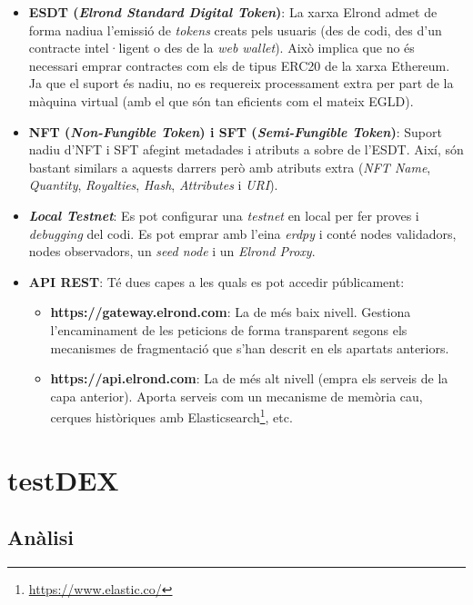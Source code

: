 \documentclass[11pt,a4paper]{article}
\begin{document}
\begin{itemize}
\item \textbf{ESDT (\textit{Elrond Standard Digital Token})}: La xarxa Elrond admet de forma nadiua l'emissió de \textit{tokens} creats pels usuaris (des de codi, des d'un contracte intel·ligent o des de la \textit{web wallet}). Això implica que no és necessari emprar contractes com els de tipus ERC20 de la xarxa Ethereum. Ja que el suport és nadiu, no es requereix processament extra per part de la màquina virtual (amb el que són tan eficients com el mateix EGLD).

\item \textbf{NFT (\textit{Non-Fungible Token}) i SFT (\textit{Semi-Fungible Token})}: Suport nadiu d'NFT i SFT afegint metadades i atributs a sobre de l'ESDT. Així, són bastant similars a aquests darrers però amb atributs extra (\textit{NFT Name}, \textit{Quantity}, \textit{Royalties}, \textit{Hash}, \textit{Attributes} i \textit{URI}).

\item \textbf{\textit{Local Testnet}}: Es pot configurar una \textit{testnet} en local per fer proves i \textit{debugging} del codi. Es pot emprar amb l'eina \textit{erdpy} i conté nodes validadors, nodes observadors, un \textit{seed node} i un \textit{Elrond Proxy}.

\item  \textbf{API REST}: Té dues capes a les quals es pot accedir públicament:
\begin{itemize}
\item \textbf{https://gateway.elrond.com}: La de més baix nivell. Gestiona l'encaminament de les peticions de forma transparent segons els mecanismes de fragmentació que s'han descrit en els apartats anteriors.
\item \textbf{https://api.elrond.com}:  La de més alt nivell (empra els serveis de la capa anterior). Aporta serveis com un mecanisme de memòria cau, cerques històriques amb Elasticsearch\footnote{\url{https://www.elastic.co/}}, etc.
\end{itemize}
\end{itemize}

\clearpage

\section{testDEX}

\subsection{Anàlisi}
\end{document}
